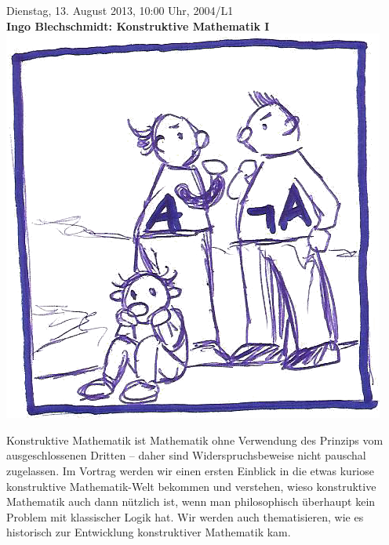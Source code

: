 \documentclass[a4paper,ngerman,landscape]{scrartcl}
\begin{document}
\begin{center}
  \Huge
  Dienstag, 13. August 2013, 10:00 Uhr, 2004/L1 \\
  \textbf{Ingo Blechschmidt: Konstruktive Mathematik I}
  \vfill
  \includegraphics[scale=1.4]{lem}
  \vfill

  \Large
  \begin{minipage}{0.83\textwidth}
    \setlength\parskip{\medskipamount}
    Konstruktive Mathematik ist Mathematik ohne Verwendung des Prinzips vom
    ausgeschlossenen Dritten -- daher sind Widerspruchsbeweise nicht pauschal
    zugelassen. Im Vortrag werden wir einen ersten Einblick in die etwas
    kuriose konstruktive Mathematik-Welt bekommen und verstehen, wieso konstruktive
    Mathematik auch dann nützlich ist, wenn man philosophisch überhaupt kein Problem
    mit klassischer Logik hat. Wir werden auch thematisieren, wie es
    historisch zur Entwicklung konstruktiver Mathematik kam.
  \end{minipage}
\end{center}
\end{document}
